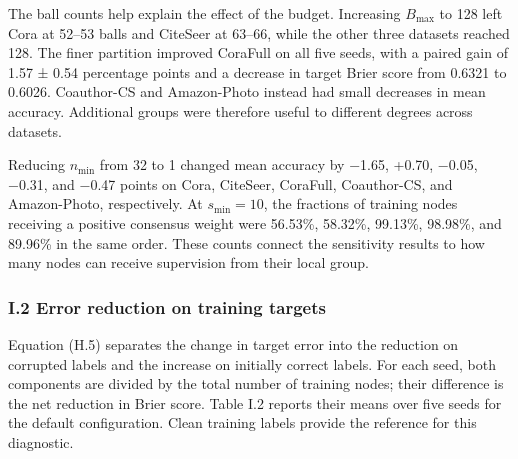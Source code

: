 The ball counts help explain the effect of the budget. Increasing \(\mathit{B}_{\max}\) to 128 left Cora at 52--53 balls and CiteSeer at 63--66, while the other three datasets reached 128. The finer partition improved CoraFull on all five seeds, with a paired gain of 1.57 ± 0.54 percentage points and a decrease in target Brier score from 0.6321 to 0.6026. Coauthor-CS and Amazon-Photo instead had small decreases in mean accuracy. Additional groups were therefore useful to different degrees across datasets.

Reducing \(\mathit{n}_{\min}\) from 32 to 1 changed mean accuracy by −1.65, +0.70, −0.05, −0.31, and −0.47 points on Cora, CiteSeer, CoraFull, Coauthor-CS, and Amazon-Photo, respectively. At \(\mathit{s}_{\min}\mathit{= 10}\), the fractions of training nodes receiving a positive consensus weight were 56.53\%, 58.32\%, 99.13\%, 98.98\%, and 89.96\% in the same order. These counts connect the sensitivity results to how many nodes can receive supervision from their local group.

\subsubsection{I.2 Error reduction on training targets}\label{i.2-error-reduction-on-training-targets}

Equation (H.5) separates the change in target error into the reduction on corrupted labels and the increase on initially correct labels. For each seed, both components are divided by the total number of training nodes; their difference is the net reduction in Brier score. Table I.2 reports their means over five seeds for the default configuration. Clean training labels provide the reference for this diagnostic.

